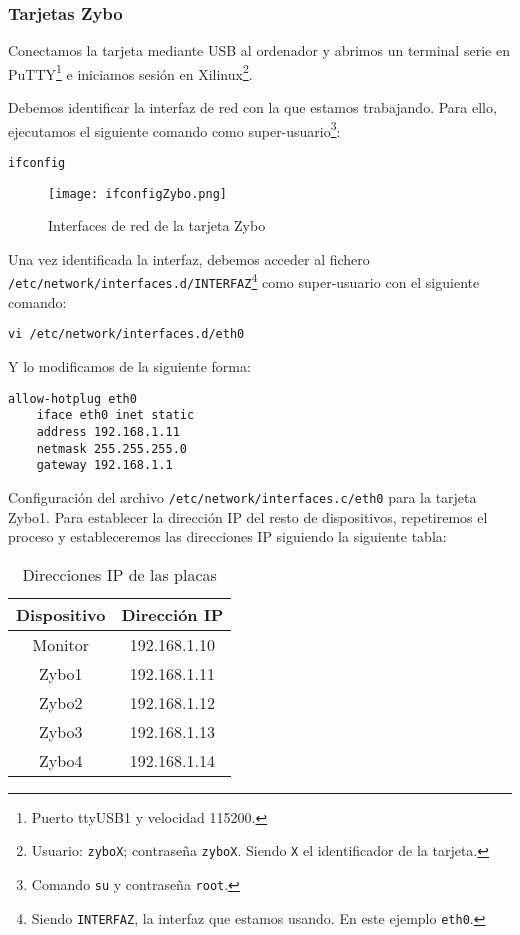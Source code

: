 \documentclass[12pt,letterpaper]{article}
\begin{document}
\subsubsection{Tarjetas Zybo}
Conectamos la tarjeta mediante USB al ordenador y abrimos un terminal serie en PuTTY\footnote{Puerto ttyUSB1 y velocidad 115200.} e iniciamos sesión en Xilinux\footnote{Usuario: \texttt{zyboX}; contraseña \texttt{zyboX}. Siendo \texttt{X} el identificador de la tarjeta.}.

Debemos identificar la interfaz de red con la que estamos trabajando. Para ello, ejecutamos el siguiente comando como super-usuario\footnote{Comando \texttt{su} y contraseña \texttt{root}.}:
\begin{center}
	\texttt{ifconfig}
\end{center}
\newpage
\begin{figure}[h]
	\centering
	\texttt{[image: ifconfigZybo.png]}
	\caption{Interfaces de red de la tarjeta Zybo}
	\label{Interfaces de red de la tarjeta Zybo}
\end{figure}

Una vez identificada la interfaz, debemos acceder al fichero\\ \texttt{/etc/network/interfaces.d/INTERFAZ}\footnote{Siendo \texttt{INTERFAZ}, la interfaz que estamos usando. En este ejemplo \texttt{eth0}.} como super-usuario con el siguiente comando:
\begin{center}
	\texttt{vi /etc/network/interfaces.d/eth0}
\end{center}
Y lo modificamos de la siguiente forma:
\begin{lstlisting}
allow-hotplug eth0
    iface eth0 inet static
    address 192.168.1.11
    netmask 255.255.255.0
    gateway 192.168.1.1
\end{lstlisting}
Configuración del archivo \texttt{/etc/network/interfaces.c/eth0} para la tarjeta Zybo1.
\newpage
Para establecer la dirección IP del resto de dispositivos, repetiremos el proceso y estableceremos las direcciones IP siguiendo la siguiente tabla:
\begin{table}[h]
	\centering
	\begin{tabular}{|c|c|}
		\hline
		\textbf{Dispositivo} & \textbf{Dirección IP} \\ \hline
		Monitor & 192.168.1.10 \\ \hline
		Zybo1 & 192.168.1.11 \\ \hline
		Zybo2 & 192.168.1.12 \\ \hline
		Zybo3 & 192.168.1.13 \\ \hline
		Zybo4 & 192.168.1.14 \\ \hline
	\end{tabular}
\caption{Direcciones IP de las placas}
\label{Direcciones IP de las placas}
\end{table}
\end{document}
